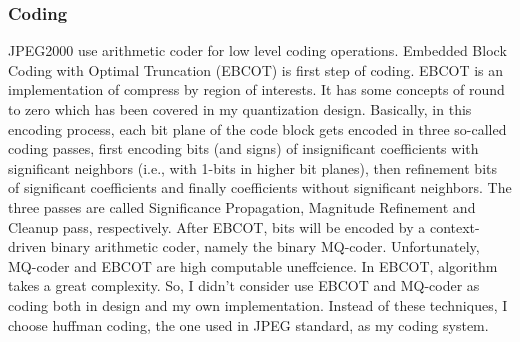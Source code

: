 \documentclass[UTF8, letterpaper, 14pt]{article}
\begin{document}
\subsubsection{Coding}
JPEG2000 use arithmetic coder for low level coding operations. Embedded Block Coding with Optimal Truncation (EBCOT) is first step of coding. EBCOT is an implementation of compress by region of interests. It has some concepts of round to zero which has been covered in my quantization design. Basically, in this encoding process, each bit plane of the code block gets encoded in three so-called coding passes, first encoding bits (and signs) of insignificant coefficients with significant neighbors (i.e., with 1-bits in higher bit planes), then refinement bits of significant coefficients and finally coefficients without significant neighbors. The three passes are called Significance Propagation, Magnitude Refinement and Cleanup pass, respectively.\cite{jpeg2kwiki} After EBCOT, bits will be encoded by a context-driven binary arithmetic coder, namely the binary MQ-coder.
Unfortunately, MQ-coder and EBCOT are high computable uneffcience. In EBCOT, algorithm takes a great complexity. So, I didn't consider use EBCOT and MQ-coder as coding both in design and my own implementation. Instead of these techniques, I choose huffman coding, the one used in JPEG standard, as my coding system.
\end{document}
